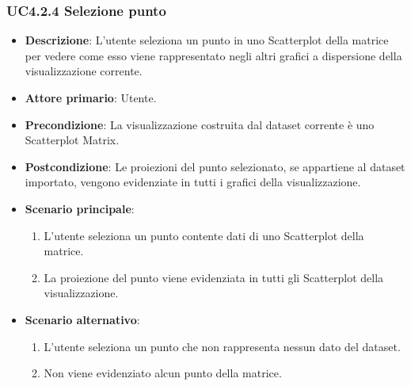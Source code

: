 \subsubsection{UC4.2.4 Selezione punto}
\label{ssub:uc4.2.4}
\begin{itemize}
    \item \textbf{Descrizione}: L'utente seleziona un punto in uno Scatterplot della matrice per vedere come 
                                esso viene rappresentato negli altri grafici a dispersione della visualizzazione corrente.
	
    \item \textbf{Attore primario}: Utente.
    
    \item \textbf{Precondizione}:   La visualizzazione costruita dal dataset corrente è uno Scatterplot Matrix.
    \item \textbf{Postcondizione}:  Le proiezioni del punto selezionato, se appartiene al dataset importato, 
                                    vengono evidenziate in tutti i grafici della visualizzazione.

	\item \textbf{Scenario principale}:
        \begin{enumerate}
            \item L'utente seleziona un punto contente dati di uno Scatterplot della matrice.
            \item La proiezione del punto viene evidenziata in tutti gli Scatterplot della visualizzazione.
        \end{enumerate}

    \item \textbf{Scenario alternativo}:
        \begin{enumerate}
            \item L'utente seleziona un punto che non rappresenta nessun dato del dataset.
            \item Non viene evidenziato alcun punto della matrice.
        \end{enumerate}

\end{itemize}



